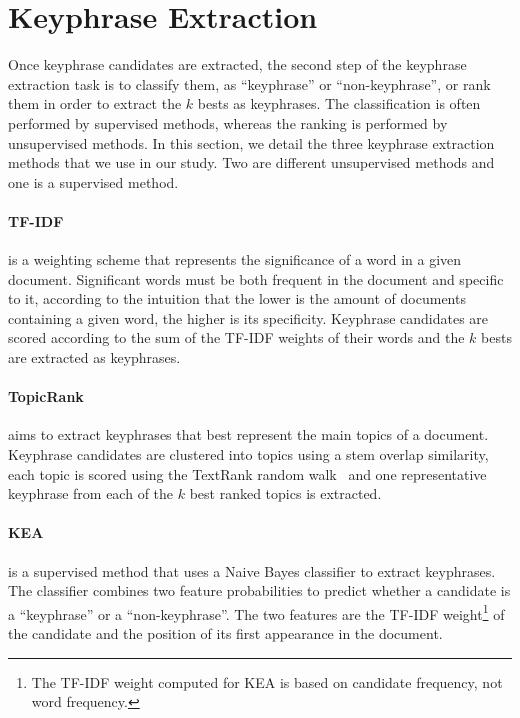 \section{Keyphrase Extraction}
\label{sec:keyphrase_extraction}
  Once keyphrase candidates are extracted, the second step of the keyphrase
  extraction task is to classify them, as ``keyphrase'' or ``non-keyphrase'', or
  rank them in order to extract the $k$ bests as keyphrases. The classification
  is often performed by supervised methods, whereas the ranking is performed by
  unsupervised methods. In this section, we detail the three keyphrase
  extraction methods that we use in our study. Two are different unsupervised
  methods and one is a supervised method.

  \paragraph{TF-IDF~\textnormal{\cite{jones1972tfidf}}} is a weighting scheme
  that represents the significance of a word in a given document. Significant
  words must be both frequent in the document and specific to it, according to
  the intuition that the lower is the amount of documents containing a given
  word, the higher is its specificity. Keyphrase candidates are scored according
  to the sum of the TF-IDF weights of their words and the $k$ bests are
  extracted as keyphrases.

  \paragraph{TopicRank~\textnormal{\cite{bougouin2013topicrank}}} aims to
  extract keyphrases that best represent the main topics of a document.
  Keyphrase candidates are clustered into topics using a stem overlap
  similarity, each topic is scored using the TextRank random
  walk~\cite{mihalcea2004textrank} and one representative keyphrase from each of
  the $k$ best ranked topics is extracted.

  \paragraph{KEA~\textnormal{\cite{witten1999kea}}} is a supervised method that
  uses a Naive Bayes classifier to extract keyphrases. The classifier combines
  two feature probabilities to predict whether a candidate is a ``keyphrase'' or
  a ``non-keyphrase''. The two features are the TF-IDF weight\footnote{The
    TF-IDF weight computed for KEA is based on candidate frequency, not word
  frequency.} of the candidate and the position of its first appearance in the
  document.

